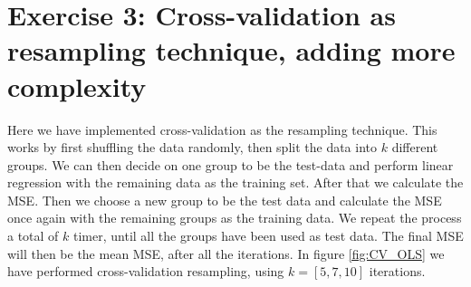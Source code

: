 \documentclass[reprint,english,notitlepage,aps,nobalancelastpage,nofootinbib]{revtex4-1}  %
\begin{document}
\section*{Exercise 3: Cross-validation as resampling technique, adding more complexity}

Here we have implemented cross-validation as the resampling technique. This works by first shuffling the data randomly, then split the data into $k$ different groups. We can then decide on one group to be the test-data and perform linear regression with the remaining data as the training set. After that we calculate the MSE. Then we choose a new group to be the test data and calculate the MSE once again with the remaining groups as the training data. We repeat the process a total of $k$ timer, until all the groups have been used as test data. The final MSE will then be the mean MSE, after all the iterations. In figure \ref{fig:CV_OLS} we have performed cross-validation resampling, using $k = [5,7,10]$ iterations.
\end{document}
